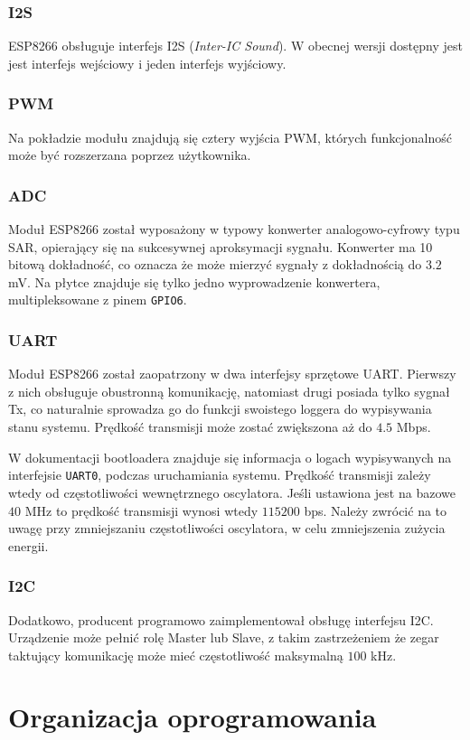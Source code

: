 \subsubsection{I2S}
\label{i2s}
ESP8266 obsługuje interfejs I2S (\textit{Inter-IC Sound}). W obecnej wersji dostępny
jest jest interfejs wejściowy i jeden interfejs wyjściowy.

\subsubsection{PWM}
\label{pwm}
Na pokładzie modułu znajdują się cztery wyjścia PWM, których funkcjonalność może
być rozszerzana poprzez użytkownika.

\subsubsection{ADC}
Moduł ESP8266 został wyposażony w typowy konwerter analogowo-cyfrowy typu SAR, opierający
się na sukcesywnej aproksymacji sygnału. Konwerter ma 10 bitową dokładność, co oznacza
że może mierzyć sygnały z dokładnością do $\num{3.2}$ \si{mV}. Na płytce znajduje się
tylko jedno wyprowadzenie konwertera, multipleksowane z pinem \verb+GPIO6+.

\subsubsection{UART}
Moduł ESP8266 został zaopatrzony w dwa interfejsy sprzętowe UART. Pierwszy z nich
obsługuje obustronną komunikację, natomiast drugi posiada tylko sygnał Tx, co naturalnie
sprowadza go do funkcji swoistego loggera do wypisywania stanu systemu. Prędkość transmisji
może zostać zwiększona aż do $\num{4.5}$ Mbps. 

W dokumentacji bootloadera znajduje się informacja o logach wypisywanych 
na interfejsie \verb+UART0+, podczas uruchamiania systemu. 
Prędkość transmisji zależy wtedy od częstotliwości
wewnętrznego oscylatora. Jeśli ustawiona jest na bazowe $\num{40}$ \si{MHz} to 
prędkość transmisji wynosi wtedy $\num{115200}$ bps. Należy zwrócić na to uwagę
przy zmniejszaniu częstotliwości oscylatora, w celu zmniejszenia zużycia energii.

\subsubsection{I2C}
Dodatkowo, producent programowo zaimplementował obsługę interfejsu I2C. 
Urządzenie może pełnić rolę Master lub Slave, z takim zastrzeżeniem że zegar
taktujący komunikację może mieć częstotliwość maksymalną $\num{100}$ \si{kHz}.

\section{Organizacja oprogramowania}
\label{organizacja_opr}
